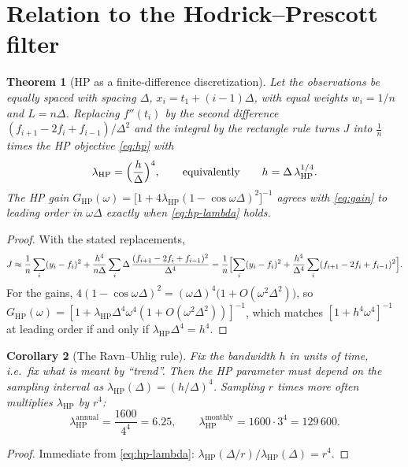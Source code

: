 \documentclass[11pt,a4paper]{article}
\newtheorem{theorem}{Theorem}
\newtheorem{corollary}[theorem]{Corollary}
\theoremstyle{definition}
\theoremstyle{remark}
\begin{document}
\section{Relation to the Hodrick--Prescott filter}
\label{sec:hp}

\begin{theorem}[HP as a finite-difference discretization]
\label{thm:hp}
Let the observations be equally spaced with spacing $\Delta$, $x_i=t_1+(i-1)\Delta$, with equal weights $w_i=1/n$ and $L=n\Delta$. Replacing $f''(t_i)$ by the second difference $(f_{i+1}-2f_i+f_{i-1})/\Delta^2$ and the integral by the rectangle rule turns $J$ into $\frac1n$ times the HP objective \eqref{eq:hp} with
\begin{equation}
\label{eq:hp-lambda}
\lambda_{\mathrm{HP}}=\Bigl(\frac{h}{\Delta}\Bigr)^4,\qquad\text{equivalently}\qquad h=\Delta\,\lambda_{\mathrm{HP}}^{1/4}.
\end{equation}
The HP gain $G_{\mathrm{HP}}(\omega)=\bigl[1+4\lambda_{\mathrm{HP}}(1-\cos\omega\Delta)^2\bigr]^{-1}$ agrees with \eqref{eq:gain} to leading order in $\omega\Delta$ exactly when \eqref{eq:hp-lambda} holds.
\end{theorem}

\begin{proof}
With the stated replacements,
\[
J\approx\frac1n\sum_i(y_i-f_i)^2+\frac{h^4}{n\Delta}\sum_i\Delta\,\frac{(f_{i+1}-2f_i+f_{i-1})^2}{\Delta^4}
=\frac1n\Bigl[\sum_i(y_i-f_i)^2+\frac{h^4}{\Delta^4}\sum_i(f_{i+1}-2f_i+f_{i-1})^2\Bigr].
\]
For the gains, $4(1-\cos\omega\Delta)^2=(\omega\Delta)^4\bigl(1+O(\omega^2\Delta^2)\bigr)$, so $G_{\mathrm{HP}}(\omega)=[1+\lambda_{\mathrm{HP}}\Delta^4\omega^4(1+O(\omega^2\Delta^2))]^{-1}$, which matches $[1+h^4\omega^4]^{-1}$ at leading order if and only if $\lambda_{\mathrm{HP}}\Delta^4=h^4$.
\end{proof}

\begin{corollary}[The Ravn--Uhlig rule]
\label{cor:ru}
Fix the bandwidth $h$ in units of time, i.e.\ fix what is meant by ``trend''. Then the HP parameter must depend on the sampling interval as $\lambda_{\mathrm{HP}}(\Delta)=(h/\Delta)^4$. Sampling $r$ times more often multiplies $\lambda_{\mathrm{HP}}$ by $r^4$:
\[
\lambda_{\mathrm{HP}}^{\text{annual}}=\frac{1600}{4^4}=6.25,\qquad
\lambda_{\mathrm{HP}}^{\text{monthly}}=1600\cdot 3^4=129\,600 .
\]
\end{corollary}

\begin{proof}
Immediate from \eqref{eq:hp-lambda}: $\lambda_{\mathrm{HP}}(\Delta/r)/\lambda_{\mathrm{HP}}(\Delta)=r^4$.
\end{proof}
\end{document}
